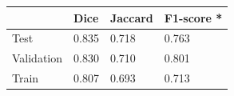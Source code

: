 \documentclass{article}
\begin{document}
\begin{table}[htbp]
\centering
\begin{tabular}{@{}llll@{}}
\toprule
& Dice & Jaccard & F1-score *\\
\midrule
Test & 0.835 & 0.718 & 0.763 \\
Validation & 0.830 & 0.710 & 0.801 \\
Train & 0.807 & 0.693 & 0.713 \\
\bottomrule
\end{tabular}
\end{table}
\end{document}
